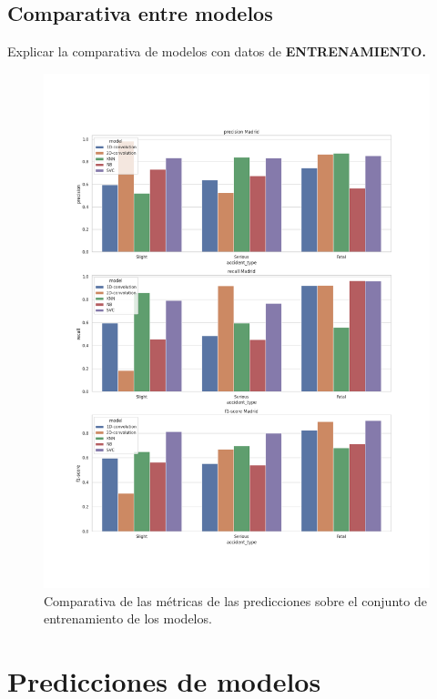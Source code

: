   \subsection{Comparativa entre modelos}

    Explicar la comparativa de modelos con datos de \textbf{ENTRENAMIENTO.}


    \begin{figure}[h]
        \centering
        \includegraphics[width=16cm]{archivos/5.Resultados/ComparativaTrain}
        \caption{Comparativa de las métricas de las predicciones sobre el conjunto de entrenamiento de los modelos.}
        \label{ResultsTrainImage}
     \end{figure}



\section{Predicciones de modelos}

